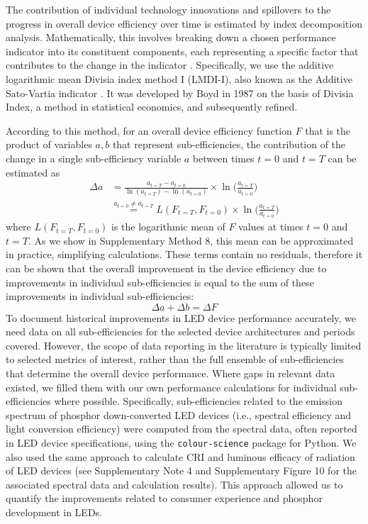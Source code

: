 \documentclass[parskip=full]{article}
\begin{document}
The contribution of individual technology innovations and spillovers to the progress in overall device efficiency over time is estimated by index decomposition analysis. Mathematically, this involves breaking down a chosen performance indicator into its constituent components, each representing a specific factor that contributes to the change in the indicator \cite{Ang1997}. Specifically, we use the additive logarithmic mean Divisia index method I (LMDI-I), also known as the Additive Sato-Vartia indicator \cite{deBoer2019}. It was developed by Boyd in 1987 \cite{Boyd1987} on the basis of Divisia Index, a method in statistical economics, and subsequently refined.

According to this method, for an overall device efficiency function $F$ that is the product of variables $a, b$ that represent sub-efficiencies, the contribution of the change in a single sub-efficiency variable $a$ between times $t=0$ and $t=T$ can be estimated as \cite{Ang2019}
%
\begin{align}
    \Delta a &= \frac{a_{t=T} - a_{t=0}}{\ln(a_{t=T}) - \ln(a_{t=0})} \times \ln \big ( \frac{a_{t=T}}{a_{t=0}} \big ) \\
    & \stackrel{a_{t=0} \neq a_{t=T}}{=} L(F_{t=T}, F_{t=0}) \times \ln \big ( \frac{a_{t=T}}{a_{t=0}} \big )
\end{align}
%
where $L(F_{t=T}, F_{t=0})$ is the logarithmic mean of $F$ values at times $t=0$ and $t=T$. As we show in Supplementary Method 8, this mean can be approximated in practice, simplifying calculations. These terms contain no residuals, therefore it can be shown that the overall improvement in the device efficiency due to improvements in individual sub-efficiencies is equal to the sum of these improvements in individual sub-efficiencies: 
%
\begin{equation}
    \Delta a + \Delta b  = \Delta F
\end{equation}
%
To document historical improvements in LED device performance accurately, we need data on all sub-efficiencies for the selected device architectures and periods covered. However, the scope of data reporting in the literature is typically limited to selected metrics of interest, rather than the full ensemble of sub-efficiencies that determine the overall device performance. Where gaps in relevant data existed, we filled them with our own performance calculations for individual sub-efficiencies where possible. Specifically, sub-efficiencies related to the emission spectrum of phosphor down-converted LED devices (i.e., spectral efficiency and light conversion efficiency)  were computed from the spectral data, often reported in LED device specifications, using the \texttt{colour-science} package for Python. We also used the same approach to calculate CRI and luminous efficacy of radiation of LED devices (see Supplementary Note 4 and Supplementary Figure 10 for the associated spectral data and calculation results). This approach allowed us to quantify the improvements related to consumer experience and phosphor development in LEDs.
\end{document}
